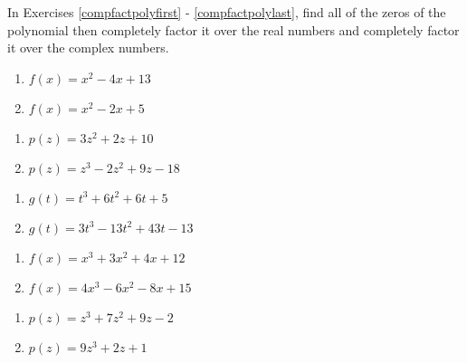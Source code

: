 In Exercises \ref{compfactpolyfirst} - \ref{compfactpolylast}, find all of the zeros of the polynomial then completely factor it over the real numbers and completely factor it over the complex numbers.

\begin{multicols}{2}
\begin{enumerate}

\item $f(x) = x^{2} - 4x + 13$ \label{compfactpolyfirst}
\item $f(x) = x^2 - 2x + 5$

\setcounter{HW}{\value{enumi}}
\end{enumerate}
\end{multicols}

\begin{multicols}{2}
\begin{enumerate}
\setcounter{enumi}{\value{HW}}

\item $p(z) = 3z^{2} + 2z + 10$
\item $p(z) = z^3-2z^2+9z-18$

\setcounter{HW}{\value{enumi}}
\end{enumerate}
\end{multicols}

\begin{multicols}{2}
\begin{enumerate}
\setcounter{enumi}{\value{HW}}

\item $g(t) = t^{3} + 6t^{2} + 6t + 5$
\item $g(t) = 3t^{3} - 13t^{2} + 43t - 13$

\setcounter{HW}{\value{enumi}}
\end{enumerate}
\end{multicols}

\begin{multicols}{2}
\begin{enumerate}
\setcounter{enumi}{\value{HW}}

\item $f(x) = x^3 + 3x^2 + 4x + 12$
\item $f(x) = 4x^3-6x^2-8x+15$

\setcounter{HW}{\value{enumi}}
\end{enumerate}
\end{multicols}

\begin{multicols}{2}
\begin{enumerate}
\setcounter{enumi}{\value{HW}}


\item  $p(z) = z^3 + 7z^2+9z-2$
\item  $p(z) = 9z^3+2z+1$

\setcounter{HW}{\value{enumi}}
\end{enumerate}
\end{multicols}


